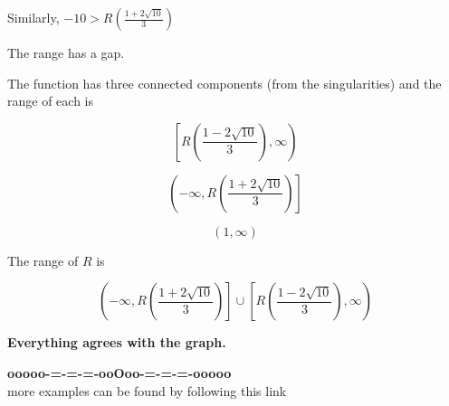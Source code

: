 \documentclass{ximera}
\begin{document}
Similarly,  $-10 > R \left( \frac{1 + 2 \sqrt{10}}{3} \right)$




The range has a gap.



The function has three connected components (from the singularities) and the range of each is 



\[
\left[ R \left( \frac{1 - 2 \sqrt{10}}{3} \right), \infty \right)
\]


\[
\left( -\infty, R \left( \frac{1 + 2 \sqrt{10}}{3} \right) \right] 
\]


\[
(1, \infty)
\]




The range of $R$ is 

\[
\left( -\infty, R \left( \frac{1 + 2 \sqrt{10}}{3} \right) \right] \cup \left[ R \left( \frac{1 - 2 \sqrt{10}}{3} \right), \infty \right)
\]








\begin{center}

\textbf{\textcolor{red!70!black}{Everything agrees with the graph.}}


\end{center}






\begin{center}
\textbf{\textcolor{green!50!black}{ooooo-=-=-=-ooOoo-=-=-=-ooooo}} \\

more examples can be found by following this link\\ 

\end{center}
\end{document}
